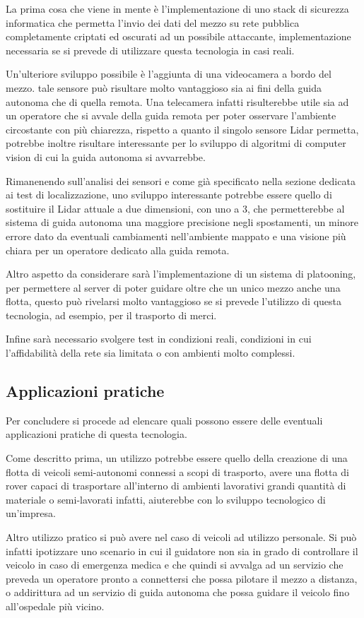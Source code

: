 \noindent La prima cosa che viene in mente è l'implementazione di uno stack di sicurezza informatica che permetta l'invio dei dati del mezzo su rete pubblica completamente criptati ed oscurati ad un possibile attaccante, implementazione necessaria se si prevede di utilizzare questa tecnologia in casi reali.

\noindent Un'ulteriore sviluppo possibile è l'aggiunta di una videocamera a bordo del mezzo. tale sensore può risultare molto vantaggioso sia ai fini della guida autonoma che di quella remota. Una telecamera infatti risulterebbe utile sia ad un operatore che si avvale della guida remota per poter osservare l'ambiente circostante con più chiarezza, rispetto a quanto il singolo sensore Lidar permetta, potrebbe inoltre risultare interessante per lo sviluppo di algoritmi di computer vision di cui la guida autonoma si avvarrebbe. 

\noindent Rimanenendo sull'analisi dei sensori e come già specificato nella sezione dedicata ai test di localizzazione, uno sviluppo interessante potrebbe essere quello di sostituire il Lidar attuale a due dimensioni, con uno a 3, che permetterebbe al sistema di guida autonoma una maggiore precisione negli spostamenti, un minore errore dato da eventuali cambiamenti nell'ambiente mappato e una visione più chiara per un operatore dedicato alla guida remota.

\noindent Altro aspetto da considerare sarà l'implementazione di un sistema di platooning, per permettere al  server di poter guidare oltre che un unico mezzo anche una flotta, questo può rivelarsi molto vantaggioso se si prevede l'utilizzo di questa tecnologia, ad esempio, per il trasporto di merci.

\noindent Infine sarà necessario svolgere test in condizioni reali, condizioni in cui l'affidabilità della rete sia limitata o con ambienti molto complessi.

\subsection{Applicazioni pratiche}
Per concludere si procede ad elencare quali possono essere delle eventuali applicazioni pratiche di questa tecnologia.

\noindent Come descritto prima, un utilizzo potrebbe essere quello della creazione di una flotta di veicoli semi-autonomi connessi a scopi di trasporto, avere una flotta di rover capaci di trasportare all'interno di ambienti lavorativi grandi quantità di materiale o semi-lavorati infatti, aiuterebbe con lo sviluppo tecnologico di un'impresa.

\noindent Altro utilizzo pratico si può avere nel caso di veicoli ad utilizzo personale. Si può infatti ipotizzare uno scenario in cui il guidatore non sia in grado di controllare il veicolo in caso di emergenza medica e che quindi si avvalga ad un servizio che preveda un operatore pronto a connettersi che possa pilotare il mezzo a distanza, o addirittura ad un servizio di guida autonoma che possa guidare il veicolo fino all'ospedale più vicino. 
